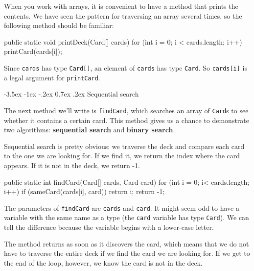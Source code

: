 \documentclass[12pt]{book}
\makeatletter
\renewcommand{\section}{\@startsection {section}{1}{\z@}%
    {-3.5ex \@plus -1ex \@minus -.2ex}%
    {0.7ex \@plus.2ex}%
    {\normalfont\Large\bfseries}}
\theoremstyle{exercise}
\newcommand{\java}[1]{\lstinline{#1}} %
\makeatother
\begin{document}
When you work with arrays, it is convenient to have a method that prints the contents.
We have seen the pattern for traversing an array several times, so the following method should be familiar:

\begin{code}
    public static void printDeck(Card[] cards) {
        for (int i = 0; i < cards.length; i++) {
            printCard(cards[i]);
        }
    }
\end{code}

Since \java{cards} has type \java{Card[]}, an element of \java{cards} has type \java{Card}.
So \java{cards[i]} is a legal argument for \java{printCard}.


\section{Sequential search}
\label{findcard}


The next method we'll write is \java{findCard}, which searches an array of \java{Card}s to see whether it contains a certain card.
This method gives us a chance to demonstrate two algorithms: {\bf sequential search} and {\bf binary search}.


Sequential search is pretty obvious: we traverse the deck and compare each card to the one we are looking for.
If we find it, we return the index where the card appears.
If it is not in the deck, we return -1.

\begin{code}
public static int findCard(Card[] cards, Card card) {
    for (int i = 0; i< cards.length; i++) {
        if (sameCard(cards[i], card)) {
            return i;
        }
    }
    return -1;
}
\end{code}

The parameters of \java{findCard} are \java{cards} and \java{card}.
It might seem odd to have a variable with the same name as a type (the \java{card} variable has type \java{Card}).
We can tell the difference because the variable begins with a lower-case letter.


The method returns as soon as it discovers the card, which means that we do not have to traverse the entire deck if we find the card we are looking for.
If we get to the end of the loop, however, we know the card is not in the deck.
\end{document}
